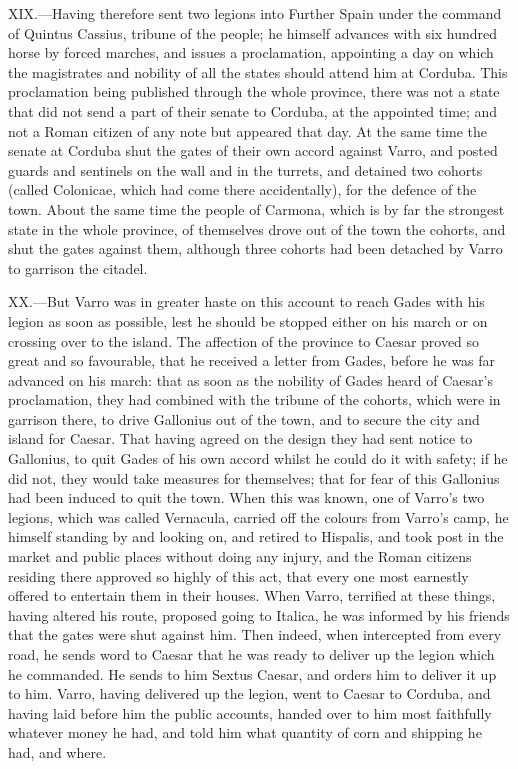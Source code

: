 XIX.—Having therefore sent two legions into Further Spain under the
command of Quintus Cassius, tribune of the people; he himself advances
with six hundred horse by forced marches, and issues a proclamation,
appointing a day on which the magistrates and nobility of all the states
should attend him at Corduba. This proclamation being published through
the whole province, there was not a state that did not send a part of
their senate to Corduba, at the appointed time; and not a Roman citizen
of any note but appeared that day. At the same time the senate at
Corduba shut the gates of their own accord against Varro, and posted
guards and sentinels on the wall and in the turrets, and detained two
cohorts (called Colonicae, which had come there accidentally), for the
defence of the town. About the same time the people of Carmona, which is
by far the strongest state in the whole province, of themselves drove
out of the town the cohorts, and shut the gates against them, although
three cohorts had been detached by Varro to garrison the citadel.

XX.—But Varro was in greater haste on this account to reach Gades with
his legion as soon as possible, lest he should be stopped either on his
march or on crossing over to the island. The affection of the province
to Caesar proved so great and so favourable, that he received a letter
from Gades, before he was far advanced on his march: that as soon as the
nobility of Gades heard of Caesar's proclamation, they had combined with
the tribune of the cohorts, which were in garrison there, to drive
Gallonius out of the town, and to secure the city and island for Caesar.
That having agreed on the design they had sent notice to Gallonius, to
quit Gades of his own accord whilst he could do it with safety; if he
did not, they would take measures for themselves; that for fear of this
Gallonius had been induced to quit the town. When this was known, one of
Varro's two legions, which was called Vernacula, carried off the colours
from Varro's camp, he himself standing by and looking on, and retired to
Hispalis, and took post in the market and public places without doing
any injury, and the Roman citizens residing there approved so highly of
this act, that every one most earnestly offered to entertain them in
their houses. When Varro, terrified at these things, having altered his
route, proposed going to Italica, he was informed by his friends that
the gates were shut against him. Then indeed, when intercepted from
every road, he sends word to Caesar that he was ready to deliver up the
legion which he commanded. He sends to him Sextus Caesar, and orders him
to deliver it up to him. Varro, having delivered up the legion, went to
Caesar to Corduba, and having laid before him the public accounts,
handed over to him most faithfully whatever money he had, and told him
what quantity of corn and shipping he had, and where.

